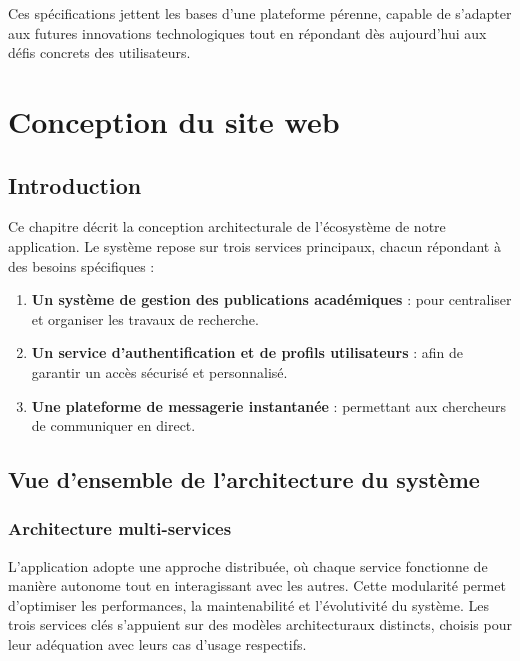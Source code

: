 \documentclass[12pt]{rapportPfe}
\begin{document}
Ces spécifications jettent les bases d’une plateforme pérenne, capable de s’adapter aux futures innovations technologiques tout en répondant dès aujourd’hui aux défis concrets des utilisateurs.

\chapter{Conception du site web}

\section{Introduction}

Ce chapitre décrit la conception architecturale de l'écosystème de notre application. Le système repose sur trois services principaux, chacun répondant à des besoins spécifiques :

\begin{enumerate}
    \item \textbf{Un système de gestion des publications académiques} : pour centraliser et organiser les travaux de recherche.
    
    \item \textbf{Un service d’authentification et de profils utilisateurs} : afin de garantir un accès sécurisé et personnalisé.
    
    \item \textbf{Une plateforme de messagerie instantanée} : permettant aux chercheurs de communiquer en direct.
    
\end{enumerate}

\section{Vue d’ensemble de l’architecture du système}

\subsection{Architecture multi-services}

L’application adopte une approche distribuée, où chaque service fonctionne de manière autonome tout en interagissant avec les autres. Cette modularité permet d’optimiser les performances, la maintenabilité et l’évolutivité du système. Les trois services clés s’appuient sur des modèles architecturaux distincts, choisis pour leur adéquation avec leurs cas d’usage respectifs.
\end{document}

